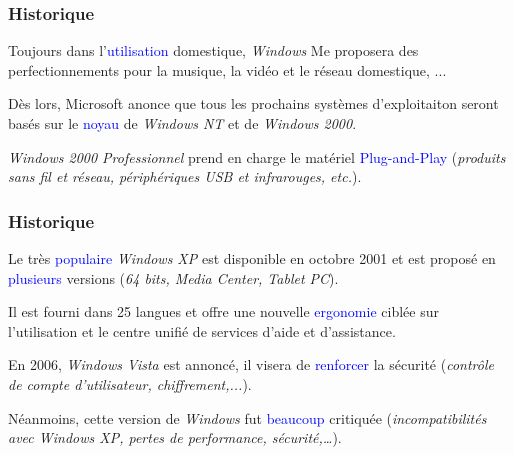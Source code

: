 \documentclass[aspectratio=169]{beamer}
\begin{document}
\begin{frame}
  \frametitle{Historique}
  Toujours dans l'\textcolor{blue}{utilisation} domestique, \textit{Windows} Me
  proposera des perfectionnements pour la musique, la vidéo et le réseau
  domestique, ...

  \hspace{0.5cm}

  Dès lors, Microsoft anonce que tous les prochains systèmes d'exploitaiton
  seront basés sur le \textcolor{blue}{noyau} de \textit{Windows NT} et de \textit{Windows 2000}.

  \hspace{0.5cm}

  \textit{Windows 2000 Professionnel} prend en charge le matériel
  \textcolor{blue}{Plug-and-Play} (\textit{produits sans fil et réseau,
  périphériques USB et infrarouges, etc.}).
\end{frame}

\begin{frame}
  \frametitle{Historique}
  Le très \textcolor{blue}{populaire} \textit{Windows XP} est disponible en octobre 2001
  et est proposé en \textcolor{blue}{plusieurs} versions (\textit{64 bits,
  Media Center, Tablet PC}).

  \hspace{0.5cm}

  Il est fourni dans 25 langues et offre une nouvelle \textcolor{blue}{ergonomie}
  ciblée sur l'utilisation et le centre unifié de services d'aide et d'assistance.

  \hspace{0.5cm}

  En 2006, \textit{Windows Vista} est annoncé, il visera de \textcolor{blue}{renforcer} la
  sécurité (\textit{contrôle de compte d'utilisateur, chiffrement,...}).

  \hspace{0.5cm}

    Néanmoins, cette version de \textit{Windows} fut \textcolor{blue}{beaucoup}
    critiquée (\textit{incompatibilités avec Windows XP, pertes de performance,
    sécurité,…}).
\end{frame}
\end{document}
